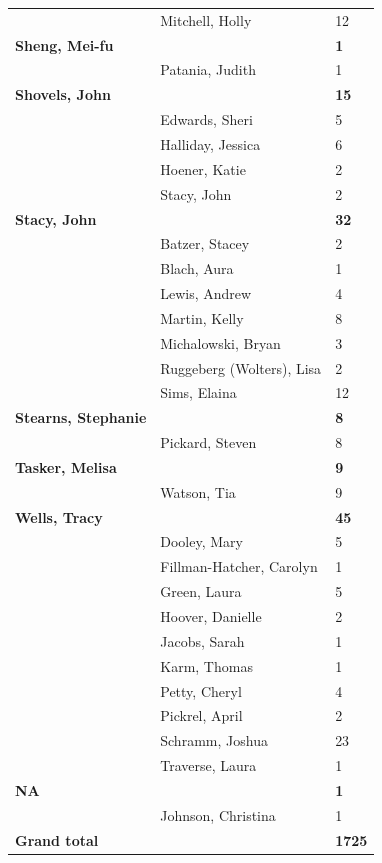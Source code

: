 \documentclass{article}\usepackage[]{graphicx}\usepackage[]{color}
\begin{document}
{\begin{longtable} { >{\raggedright}p{}|p{}p{}}
   & Mitchell, Holly & 12 \\ 
  \textbf{Sheng, Mei-fu} &  & \hspace{2cm}\textbf{1} \\ 
   & Patania, Judith & 1 \\ 
   \rowcolor[gray]{0.90}\textbf{Shovels, John} &  & \hspace{2cm}\textbf{15} \\ 
   \rowcolor[gray]{0.90} & Edwards, Sheri & 5 \\ 
   \rowcolor[gray]{0.90} & Halliday, Jessica & 6 \\ 
   & Hoener, Katie & 2 \\ 
   & Stacy, John & 2 \\ 
  \textbf{Stacy, John} &  & \hspace{2cm}\textbf{32} \\ 
   \rowcolor[gray]{0.90} & Batzer, Stacey & 2 \\ 
   \rowcolor[gray]{0.90} & Blach, Aura & 1 \\ 
   \rowcolor[gray]{0.90} & Lewis, Andrew & 4 \\ 
   & Martin, Kelly & 8 \\ 
   & Michalowski, Bryan & 3 \\ 
   & Ruggeberg (Wolters), Lisa & 2 \\ 
   \rowcolor[gray]{0.90} & Sims, Elaina & 12 \\ 
   \rowcolor[gray]{0.90}\textbf{Stearns, Stephanie} &  & \hspace{2cm}\textbf{8} \\ 
   \rowcolor[gray]{0.90} & Pickard, Steven & 8 \\ 
  \textbf{Tasker, Melisa} &  & \hspace{2cm}\textbf{9} \\ 
   & Watson, Tia & 9 \\ 
  \textbf{Wells, Tracy} &  & \hspace{2cm}\textbf{45} \\ 
   \rowcolor[gray]{0.90} & Dooley, Mary & 5 \\ 
   \rowcolor[gray]{0.90} & Fillman-Hatcher, Carolyn & 1 \\ 
   \rowcolor[gray]{0.90} & Green, Laura & 5 \\ 
   & Hoover, Danielle & 2 \\ 
   & Jacobs, Sarah & 1 \\ 
   & Karm, Thomas & 1 \\ 
   \rowcolor[gray]{0.90} & Petty, Cheryl & 4 \\ 
   \rowcolor[gray]{0.90} & Pickrel, April & 2 \\ 
   \rowcolor[gray]{0.90} & Schramm, Joshua & 23 \\ 
   & Traverse, Laura & 1 \\ 
  \textbf{NA} &  & \hspace{2cm}\textbf{1} \\ 
   & Johnson, Christina & 1 \\ 
   \rowcolor[gray]{0.90}\textbf{Grand total} &  & \textbf{1725} \\ 
   \end{longtable}

}
\end{document}
